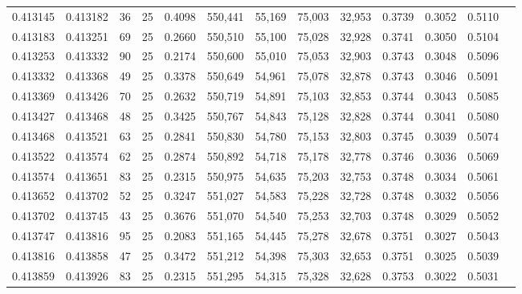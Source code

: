 \begin{tabular}{rrrrrrrrrrrrr}
0.413145 & 0.413182 &    36 &  25 &                                     0.4098 & 550,441 &  55,169 &  75,003 &  32,953 & 0.3739 & 0.3052 & 0.5110 \\
0.413183 & 0.413251 &    69 &  25 &                                     0.2660 & 550,510 &  55,100 &  75,028 &  32,928 & 0.3741 & 0.3050 & 0.5104 \\
0.413253 & 0.413332 &    90 &  25 &                                     0.2174 & 550,600 &  55,010 &  75,053 &  32,903 & 0.3743 & 0.3048 & 0.5096 \\
0.413332 & 0.413368 &    49 &  25 &                                     0.3378 & 550,649 &  54,961 &  75,078 &  32,878 & 0.3743 & 0.3046 & 0.5091 \\
0.413369 & 0.413426 &    70 &  25 &                                     0.2632 & 550,719 &  54,891 &  75,103 &  32,853 & 0.3744 & 0.3043 & 0.5085 \\
0.413427 & 0.413468 &    48 &  25 &                                     0.3425 & 550,767 &  54,843 &  75,128 &  32,828 & 0.3744 & 0.3041 & 0.5080 \\
0.413468 & 0.413521 &    63 &  25 &                                     0.2841 & 550,830 &  54,780 &  75,153 &  32,803 & 0.3745 & 0.3039 & 0.5074 \\
0.413522 & 0.413574 &    62 &  25 &                                     0.2874 & 550,892 &  54,718 &  75,178 &  32,778 & 0.3746 & 0.3036 & 0.5069 \\
0.413574 & 0.413651 &    83 &  25 &                                     0.2315 & 550,975 &  54,635 &  75,203 &  32,753 & 0.3748 & 0.3034 & 0.5061 \\
0.413652 & 0.413702 &    52 &  25 &                                     0.3247 & 551,027 &  54,583 &  75,228 &  32,728 & 0.3748 & 0.3032 & 0.5056 \\
0.413702 & 0.413745 &    43 &  25 &                                     0.3676 & 551,070 &  54,540 &  75,253 &  32,703 & 0.3748 & 0.3029 & 0.5052 \\
0.413747 & 0.413816 &    95 &  25 &                                     0.2083 & 551,165 &  54,445 &  75,278 &  32,678 & 0.3751 & 0.3027 & 0.5043 \\
0.413816 & 0.413858 &    47 &  25 &                                     0.3472 & 551,212 &  54,398 &  75,303 &  32,653 & 0.3751 & 0.3025 & 0.5039 \\
0.413859 & 0.413926 &    83 &  25 &                                     0.2315 & 551,295 &  54,315 &  75,328 &  32,628 & 0.3753 & 0.3022 & 0.5031 \\

\end{tabular}
